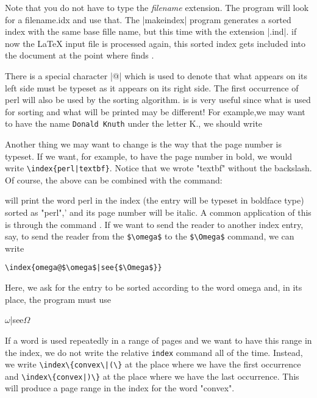 \begin{multicols}{2}
Note that you do not have to type the \textit{filename} extension. The program will look for a filename.idx and use that.
The |makeindex| program generates a sorted index with the same base fille name, but this time with the extension |.ind|. if now
the LaTeX input file is processed again, this sorted index gets included into the document at the point where \latex
finds .

There is a  special character |@| which is used to denote that what appears on its left side must be
typeset as it appears on its right side.  The first occurrence of perl will also be used
by the sorting algorithm. is is very useful since what is used for sorting and what
will be printed may be different! For example,we may want to have the name 
\texttt{Donald Knuth}  under the letter K., we should write

\begin{sverbatim}
\end{sverbatim}

Another thing we may want to change is the way that the page number is typeset.
If we want, for example, to have the page number in bold, we would write
\verb+\index{perl|textbf}+.  Notice that we wrote "textbf"  without the backslash. Of course,
the above can be combined with the  command:

\begin{sverbatim}
\end{sverbatim}

will print the word perl in the index (the entry will be typeset in boldface type) sorted
as "perl",’ and its page number will be italic. A common application of this is through
the command . If we want to send the reader to another index entry, say, to send
the reader from the \verb+$\omega$+ to the \verb+$\Omega$+ command, we can write

\verb+\index{omega@$\omega$|see{$\Omega$}}+


Here, we ask for the entry to be sorted according to the word omega and, in its place,
the program must use 

\begin{teX}
$\omega$|see{$\Omega$}
\end{teX}

If a word is used repeatedly in a range of pages and we want to have this range
in the index, we do not write the relative \texttt{index} command all of the time. Instead,
we write \verb+\index\{convex\|(\}+  at the place where we have the first occurrence and
\verb+\index\{convex|)\}+  at the place where we have the last occurrence. This will produce a
page range in the index for the word "convex".


\end{multicols}
